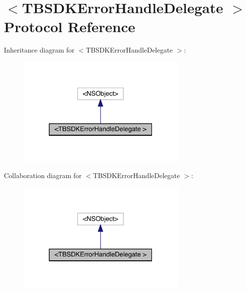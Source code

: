 \hypertarget{protocol_t_b_s_d_k_error_handle_delegate_01-p}{}\section{$<$T\+B\+S\+D\+K\+Error\+Handle\+Delegate $>$ Protocol Reference}
\label{protocol_t_b_s_d_k_error_handle_delegate_01-p}


Inheritance diagram for $<$T\+B\+S\+D\+K\+Error\+Handle\+Delegate $>$\+:\nopagebreak
\begin{figure}[H]
\begin{center}
\leavevmode
\includegraphics[width=238pt]{protocol_t_b_s_d_k_error_handle_delegate_01-p__inherit__graph}
\end{center}
\end{figure}


Collaboration diagram for $<$T\+B\+S\+D\+K\+Error\+Handle\+Delegate $>$\+:\nopagebreak
\begin{figure}[H]
\begin{center}
\leavevmode
\includegraphics[width=238pt]{protocol_t_b_s_d_k_error_handle_delegate_01-p__coll__graph}
\end{center}
\end{figure}
